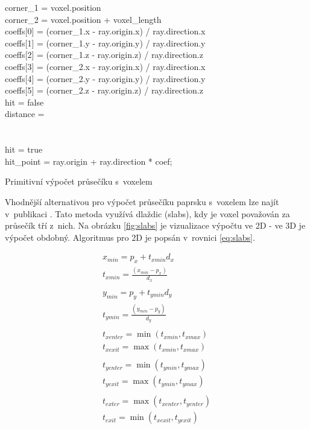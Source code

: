 \begin{center}
	\begin{czechalgorithm}[H] \label{alg:ray_box_primitive}
		corner_1 = voxel.position\\
		corner_2 = voxel.position + voxel\_length\\
		coeffs[0] = (corner_1.x - ray.origin.x) / ray.direction.x\\
		coeffs[1] = (corner_1.y - ray.origin.y) / ray.direction.y\\
		coeffs[2] = (corner_1.z - ray.origin.z) / ray.direction.z\\
		coeffs[3] = (corner_2.x - ray.origin.x) / ray.direction.x\\
		coeffs[4] = (corner_2.y - ray.origin.y) / ray.direction.y\\
		coeffs[5] = (corner_2.z - ray.origin.z) / ray.direction.z\\
		hit = false\\
		distance = \inf\\
		 {\\
			 {\\
				hit = true\\
				hit\_point = ray.origin + ray.direction * coef;\\
			}
		}
		\caption{Primitivní výpočet průsečíku s~voxelem}
	\end{czechalgorithm}
\end{center}

Vhodnější alternativou pro výpočet průsečíku paprsku s~voxelem lze najít v~publikaci \cite{efficient_box_intersect}. Tato metoda využívá dlaždic (slabs), kdy je voxel považován za průsečík tří z~nich. Na obrázku \ref{fig:slabs} je vizualizace výpočtu ve 2D - ve 3D je výpočet obdobný. Algoritmus pro 2D je popsán v~rovnici \ref{eq:slabs}.


\begin{equation} \label{eq:slabs}
	\begin{gathered}
		x_{min} = p_x + t_{xmin} d_x\\
		t_{xmin} = \frac{(x_{min} - p_x)}{d_x}\\
		\\
		y_{min} = p_y + t_{ymin} d_y\\
		t_{ymin} = \frac{(y_{min} - p_y)}{d_y}\\
		\\
		t_{xenter} = \min(t_{xmin}, t_{xmax})\\
		t_{xexit} = \max(t_{xmin}, t_{xmax})\\
		\\
		t_{yenter} = \min(t_{ymin}, t_{ymax})\\
		t_{yexit} = \max(t_{ymin}, t_{ymax})\\
		\\
		t_{exter} = \max(t_{xenter}, t_{yenter})\\
		t_{exit} = \min(t_{xexit}, t_{yexit})\\
	\end{gathered}
\end{equation}

